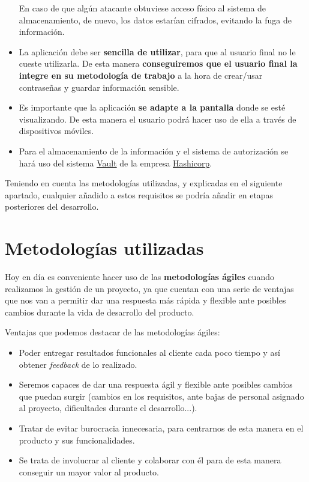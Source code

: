 \documentclass{\ClassPath/viu-tfm-template}
\begin{document}
\begin{itemize}
    En caso de que algún atacante obtuviese acceso físico al sistema de almacenamiento, de nuevo, los datos estarían cifrados, evitando la fuga de información.

    \item La aplicación debe ser \textbf{sencilla de utilizar}, para que al usuario final no le cueste utilizarla. De esta manera \textbf{conseguiremos que el usuario final la integre en su metodología de trabajo} a la hora de crear/usar contraseñas y guardar información sensible.

    \item Es importante que la aplicación \textbf{se adapte a la pantalla} donde se esté visualizando. De esta manera el usuario podrá hacer uso de ella a través de dispositivos móviles.

    \item Para el almacenamiento de la información y el sistema de autorización se hará uso del sistema \href{https://www.vaultproject.io/}{Vault} de la empresa \href{https://www.hashicorp.com/}{Hashicorp}.
\end{itemize}

Teniendo en cuenta las metodologías utilizadas, y explicadas en el siguiente apartado, cualquier añadido a estos requisitos se podría añadir en etapas posteriores del desarrollo.




\chapter{Metodologías utilizadas}

Hoy en día es conveniente hacer uso de las \textbf{metodologías ágiles} cuando realizamos la gestión de un proyecto, ya que cuentan con una serie de ventajas que nos van a permitir dar una respuesta más rápida y flexible ante posibles cambios durante la vida de desarrollo del producto.

Ventajas que podemos destacar de las metodologías ágiles:

\begin{itemize}
    \item Poder entregar resultados funcionales al cliente cada poco tiempo y así obtener \textit{feedback} de lo realizado.
    \item Seremos capaces de dar una respuesta ágil y flexible ante posibles cambios que puedan surgir (cambios en los requisitos, ante bajas de personal asignado al proyecto, dificultades durante el desarrollo...).
    \item Tratar de evitar burocracia innecesaria, para centrarnos de esta manera en el producto y sus funcionalidades.
    \item Se trata de involucrar al cliente y colaborar con él para de esta manera conseguir un mayor valor al producto.
\end{itemize}
\end{document}

